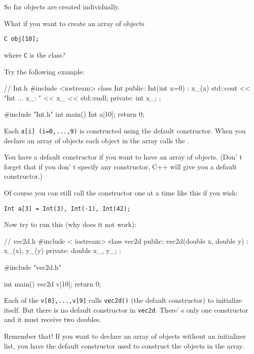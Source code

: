 \newpage{}

So far objects are created individually.

What if you want to create an array of objects
\begin{center}
\texttt{C obj[10];}
\end{center}
where \texttt{C} is the class?

Try the following example:
\begin{console}
// Int.h
#include <iostream>
class Int
{     
public:
        Int(int x=0)
           : x_(x)
        {
             std::cout << "Int ... x_: " << x_
                       << std::endl;
        }
private:
        int x_;
};
\end{console}
\begin{console}
#include "Int.h"
int main()
{   
    Int a[10];
    return 0;
}
\end{console}
 Each \texttt{a[i] (i=0,...,9)} is constructed using the
default constructor. When you declare an array of objects each object in
the array calls the .

You  have a default constructor if you want to have an
array of objects. (Don' t forget that if you
don' t specify any constructor, C++ will give you a
default constructor.)

Of course you can still call the constructor one at a time like this if
you wish:
\begin{center}
\texttt{Int a[3] = {Int(3), Int(-1), Int(42)};}
\end{center}
Now try to run this (why does it not work):
\begin{console}
// vec2d.h
#include < iostream>
class vec2d
{
public:
        vec2d(double x, double y)
                : x_(x), y_(y)
                {}
private:
        double x_, y_;
};
\end{console}
\begin{console}
#include "vec2d.h"

int main()
{   
    vec2d v[10];
    return 0;
}
\end{console}
 Each of the \texttt{v[0],...,v[9]} calls \texttt{vec2d()}
(the default constructor) to initialize itself. But there is no default
constructor in \texttt{vec2d}. There' s only one
constructor and it must receive two doubles.

Remember that! If you want to declare an array of objects without an
initializer list, you  have the default constructor used to
construct the objects in the array.


